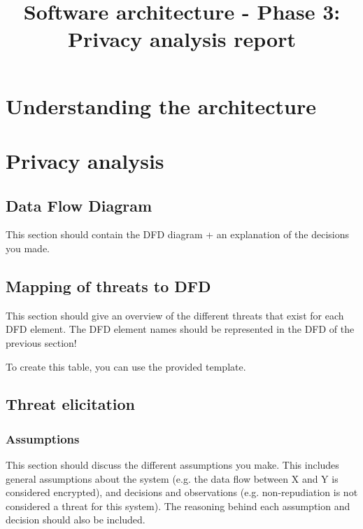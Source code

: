 \documentclass[a4paper]{article}
\title{Software architecture - Phase 3: Privacy analysis report}
\date{}
\begin{document}
\maketitle

\setcounter{tocdepth}{4}
\tableofcontents{}
\setcounter{secnumdepth}{3}

\newpage{}

\section{Understanding the architecture}
\section{Privacy analysis}

\subsection{Data Flow Diagram}

This section should contain the DFD diagram + an explanation of the decisions you made.


\subsection{Mapping of threats to DFD}

This section should give an overview of the different threats that exist for each DFD element.
The DFD element names should be represented in the DFD of the previous section!

To create this table, you can use the provided template.



\subsection{Threat elicitation}
\subsubsection{Assumptions}

This section should discuss the different assumptions you make. This includes general assumptions about the system (e.g. the data flow between X and Y is considered encrypted), and decisions and observations (e.g. non-repudiation is not considered a threat for this system). The reasoning behind each assumption and decision should also be included.
\end{document}
